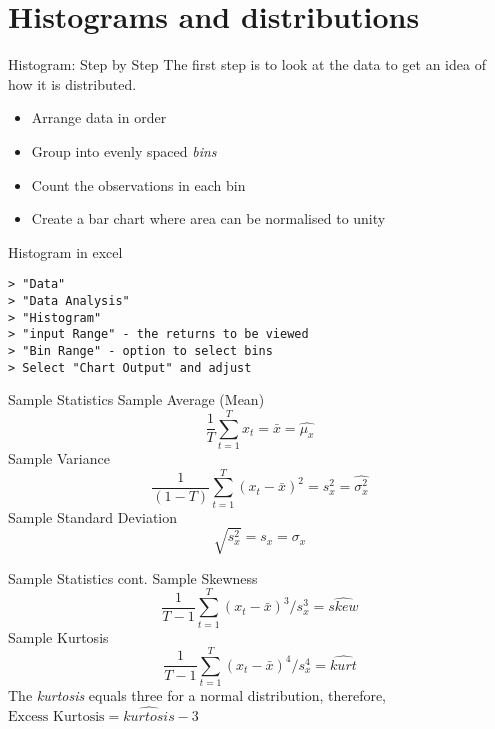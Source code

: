 \documentclass[14pt,xcolor=pdftex,dvipsnames,table]{beamer}
\begin{document}
\section{Histograms and distributions}
\begin{frame}{Histogram: Step by Step}
The first step is to look at the data to get an idea of how it is distributed.  
\begin{itemize}
\item Arrange data in order
\item Group into evenly spaced \emph{bins}
\item Count the observations in each bin
\item Create a bar chart where area can be normalised to unity
\end{itemize}
\end{frame}

\begin{frame}[fragile]{Histogram in excel}
\begin{verbatim}
> "Data"
> "Data Analysis"
> "Histogram"
> "input Range" - the returns to be viewed
> "Bin Range" - option to select bins
> Select "Chart Output" and adjust
\end{verbatim}
\end{frame}

\begin{frame}{Sample Statistics}
Sample Average (Mean)
\begin{equation}
\frac{1}{T}\sum_{t=1}^T x_t = \bar{x} = \hat{\mu_x}
\end{equation}
Sample Variance
\begin{equation}
\frac{1}{(1-T)} \sum_{t=1}^T (x_t - \bar{x})^2 = s_x^2 = \hat{\sigma_x^2}
\end{equation}
Sample Standard Deviation
\begin{equation}
\sqrt{s_x^2} = s_x = \hat{\sigma_x}
\end{equation}
\end{frame}

\begin{frame}{Sample Statistics cont.}
Sample Skewness
\begin{equation}
\frac{1}{T-1} \sum_{t = 1}^T (x_t - \bar{x})^3 /s_x^3 = \hat{skew}
\end{equation}
Sample Kurtosis
\begin{equation}
\frac{1}{T-1} \sum_{t = 1}^T (x_t - \bar{x})^4 /s_x^4 = \hat{kurt}
\end{equation}
The \emph{kurtosis} equals three for a normal distribution, therefore,\\ 
$\text{Excess Kurtosis} = \hat{kurtosis} - 3$
\end{frame}
\end{document}
